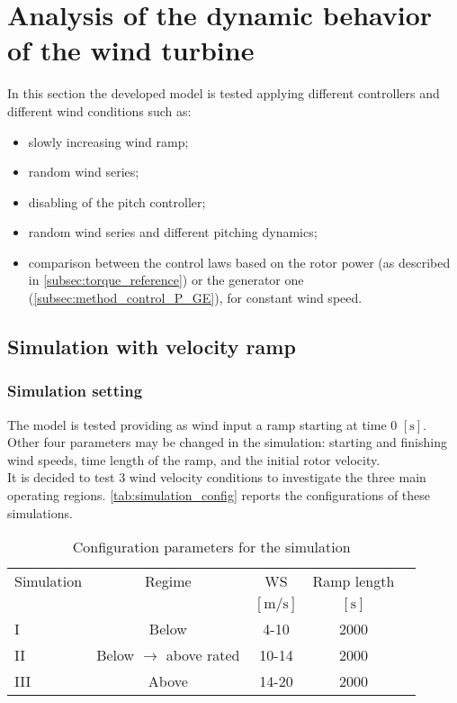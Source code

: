 \newpage
\section{Analysis of the dynamic behavior of the wind turbine}\label{sec:c_basic_model_simulation}
In this section the developed model is tested applying different controllers and different wind conditions such as:
\begin{itemize}
  \item slowly increasing wind ramp;
  \item random wind series;
  \item disabling of the pitch controller;
  \item random wind series and different pitching dynamics;
  \item comparison between the control laws based on the rotor power (as described in \autoref{subsec:torque_reference}) or the generator one (\autoref{subsec:method_control_P_GE}), for constant wind speed.
\end{itemize}
\subsection{Simulation with velocity ramp}
\subsubsection{Simulation setting}
The model is tested providing as wind input a ramp starting at time 0 $\left[\si{\second}\right]$. Other four parameters may be changed in the simulation: starting and finishing wind speeds, time length of the ramp, and the initial rotor velocity.\\
It is decided to test 3 wind velocity conditions to investigate the three main operating regions. \autoref{tab:simulation_config} reports the configurations of these simulations. 
\begin{table}[htb]
    \caption{Configuration parameters for the simulation}
    \centering
    \begin{tabular}{lcccc}
    \toprule
      Simulation & Regime  & WS & Ramp length \\ 
       & & $\left[\si{\meter\per\second}\right]$ & $\left[\si{\second}\right]$ \\ \midrule       
       I & Below & 4-10 & 2000  \\
       II & Below $\rightarrow$ above rated & 10-14 & 2000 \\
       III & Above & 14-20 & 2000  \\
       \bottomrule
    \end{tabular}
    \label{tab:simulation_config}
\end{table}

